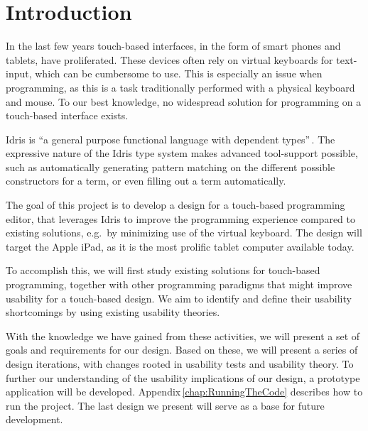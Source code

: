 \chapter{Introduction}
\label{sec:Introduction}
In the last few years touch-based interfaces, in the form of smart phones and tablets, have proliferated. These devices often rely on virtual keyboards for text-input, which can be cumbersome to use.
This is especially an issue when programming, as this is a task traditionally performed with a physical keyboard and mouse.
To our best knowledge, no widespread solution for programming on a touch-based interface exists.

Idris is ``a general purpose functional language with dependent types''\,\cite{brady2013idris}. The expressive nature of the Idris type system makes advanced tool-support possible, such as automatically generating pattern matching on the different possible constructors for a term, or even filling out a term automatically.

The goal of this project is to develop a design for a touch-based programming editor, that leverages Idris to improve the programming experience compared to existing solutions, e.g.\ by minimizing use of the virtual keyboard.
The design will target the Apple iPad, as it is the most prolific tablet computer available today.

To accomplish this, we will first study existing solutions for touch-based programming, together with other programming paradigms that might improve usability for a touch-based design.
We aim to identify and define their usability shortcomings by using existing usability theories.

With the knowledge we have gained from these activities, we will present a set of goals and requirements for our design.
Based on these, we will present a series of design iterations, with changes rooted in usability tests and usability theory.
To further our understanding of the usability implications of our design, a prototype application will be developed.
Appendix\,\ref{chap:RunningTheCode} describes how to run the project.
The last design we present will serve as a base for future development.

